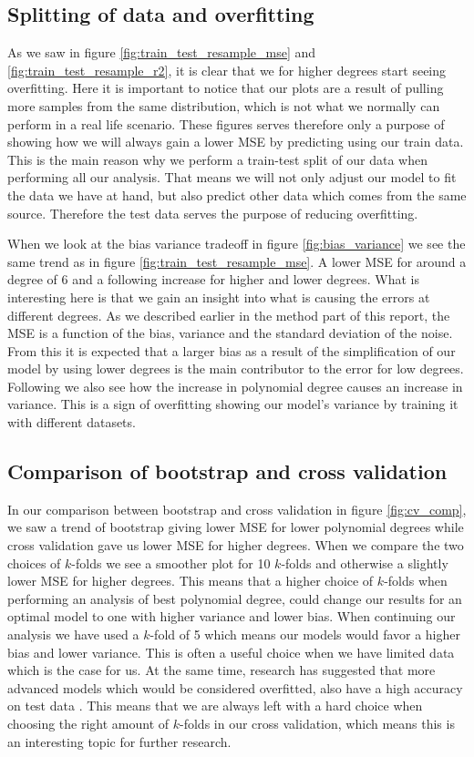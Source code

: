 \documentclass[12pt]{article}
\begin{document}
\subsection{Splitting of data and overfitting}
As we saw in figure \ref{fig:train_test_resample_mse} and \ref{fig:train_test_resample_r2}, it is clear that we for higher degrees start seeing overfitting. Here it is important to notice that our plots are a result of pulling more samples from the same distribution, which is not what we normally can perform in a real life scenario. These figures serves therefore only a purpose of showing how we will always gain a lower MSE by predicting using our train data. This is the main reason why we perform a train-test split of our data when performing all our analysis. That means we will not only adjust our model to fit the data we have at hand, but also predict other data which comes from the same source. Therefore the test data serves the purpose of reducing overfitting.

When we look at the bias variance tradeoff in figure \ref{fig:bias_variance} we see the same trend as in figure \ref{fig:train_test_resample_mse}. A lower MSE for around a degree of 6 and a following increase for higher and lower degrees. What is interesting here is that we gain an insight into what is causing the errors at different degrees. As we described earlier in the method part of this report, the MSE is a function of the bias, variance and the standard deviation of the noise. From this it is expected that a larger bias as a result of the simplification of our model by using lower degrees is the main contributor to the error for low degrees. Following we also see how the increase in polynomial degree causes an increase in variance. This is a sign of overfitting showing our model's variance by training it with different datasets.

\subsection{Comparison of bootstrap and cross validation}
In our comparison between bootstrap and cross validation in figure \ref{fig:cv_comp}, we saw a trend of bootstrap giving lower MSE for lower polynomial degrees while cross validation gave us lower MSE for higher degrees. When we compare the two choices of $k$-folds we see a smoother plot for 10 $k$-folds and otherwise a slightly lower MSE for higher degrees. This means that a higher choice of $k$-folds when performing an analysis of best polynomial degree, could change our results for an optimal model to one with higher variance and lower bias. When continuing our analysis we have used a $k$-fold of 5 which means our models would favor a higher bias and lower variance. This is often a useful choice when we have limited data which is the case for us. At the same time, research has suggested that more advanced models which would be considered overfitted, also have a high accuracy on test data \cite{overfitting}. This means that we are always left with a hard choice when choosing the right amount of $k$-folds in our cross validation, which means this is an interesting topic for further research.
\end{document}
